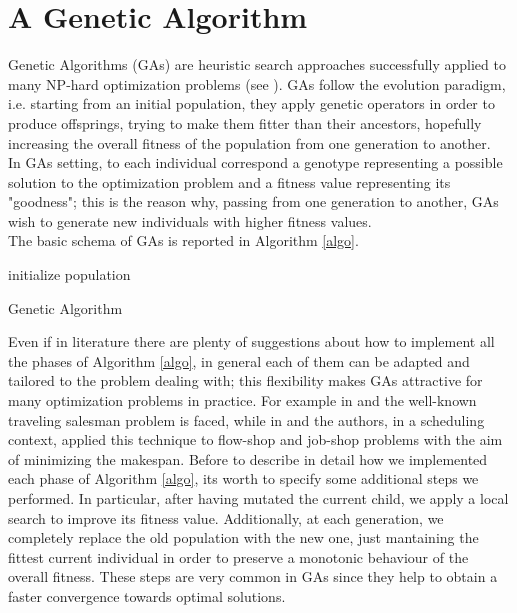 \documentclass[opre,nonblindrev]{informs3} %
\begin{document}
\section{A Genetic Algorithm}
Genetic Algorithms (GAs) are heuristic search approaches successfully applied to many NP-hard optimization problems (see \cite{kramer}). GAs follow the evolution paradigm, i.e. starting from an initial population, they apply genetic operators in order to produce offsprings, trying to make them fitter than their ancestors, hopefully increasing the overall fitness of the population from one generation to another.\\
In GAs setting, to each individual correspond a genotype representing a possible solution to the optimization problem and a fitness value representing its "goodness"; this is the reason why, passing from one generation to another, GAs wish to generate new individuals with higher fitness values.\\
The	basic schema of GAs is reported in Algorithm \ref{algo}.\\
\begin{algorithm} \label{algo}
	\SetAlgoLined
	initialize population\\
	\caption{Genetic Algorithm}
\end{algorithm}
\noindent Even if in literature there are plenty of suggestions about how to implement all the phases of Algorithm \ref{algo}, in general each of them can be adapted and tailored to the problem dealing with; this flexibility makes GAs attractive for many optimization problems in practice. For example in \cite{tsp1, tsp2} and \cite{tsp3} the well-known traveling salesman problem is faced, while in \cite{sched1} and \cite{sched3} the authors, in a scheduling context, applied this technique to flow-shop and job-shop problems with the aim of minimizing the makespan.
Before to describe in detail how we implemented each phase of Algorithm \ref{algo}, its worth to specify some additional steps we performed. In particular, after having mutated the current child, we apply a local search to improve its fitness value. Additionally, at each generation, we completely replace the old population with the new one, just mantaining the fittest current individual in order to preserve a monotonic behaviour of the overall fitness. These steps are very common in GAs since they help to obtain a faster convergence towards optimal solutions.
\end{document}
